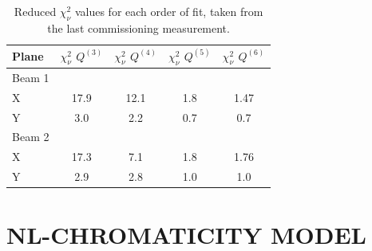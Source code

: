 \begin{table}[tbh]
    \centering
    \begin{tabular}{|l||c|c|c|c|}
    \hline
        Plane     &  $\chi^2_\nu$ $Q^{(3)}$ & $\chi^2_\nu$ $Q^{(4)}$ &  $\chi^2_\nu$ $Q^{(5)}$ &  $\chi^2_\nu$ $Q^{(6)}$  \\ \hline\hline
        Beam 1    &   &   &   & \\
        X         & 17.9  & 12.1 & 1.8 & 1.47 \\               %
        Y         &  3.0  & 2.2  & 0.7 & 0.7 \\ \hline        %
        Beam 2    &    &    &   &\\
        X         & 17.3 & 7.1 & 1.8 & 1.76 \\             %
        Y         & 2.9  & 2.8 & 1.0 & 1.0 \\ \hline      %
    \end{tabular}
    \caption{Reduced $\chi^2_\nu$ values for each order of fit, taken from the last commissioning measurement.}
    \label{table_chisquare}
\end{table}





\section{NL-CHROMATICITY MODEL}
\label{sec:nl_chroma_model}

